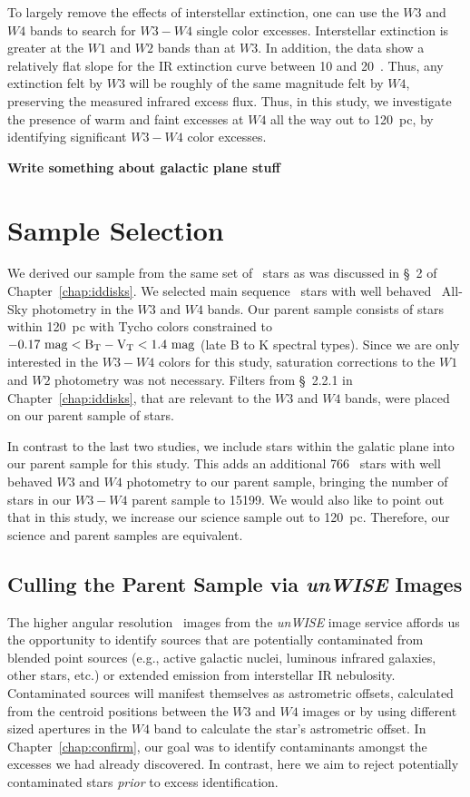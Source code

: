     To largely remove the effects of interstellar extinction, one can use the $W3$ and $W4$ bands to search for $W3-W4$ single color excesses. Interstellar extinction is greater at the $W1$ and $W2$ bands than at $W3$. In addition, the data show a relatively flat slope for the IR extinction curve between 10 and 20\micron\ \citep{Wang2014}. Thus, any extinction felt by $W3$ will be roughly of the same magnitude felt by $W4$, preserving the measured infrared excess flux. Thus, in this study, we investigate the presence of warm and faint excesses at $W4$ all the way out to 120~pc, by identifying significant $W3-W4$ color excesses.
    
    
    \textbf{Write something about galactic plane stuff}


\section{Sample Selection}

    We derived our sample from the same set of \hip\ stars as was discussed in \S~2 of Chapter~\ref{chap:iddisks}. We selected main sequence \hip\ stars with well behaved \WS\ All-Sky photometry in the $W3$ and $W4$ bands. Our parent sample consists of stars within 120~pc with Tycho colors constrained to $-0.17~\rm{mag}< B_T-V_T< 1.4~\rm{mag}$ (late B to K spectral types). Since we are only interested in the $W3-W4$ colors for this study, saturation corrections to the $W1$ and $W2$ photometry was not necessary. Filters from \S~2.2.1 in Chapter~\ref{chap:iddisks}, that are relevant to the $W3$ and $W4$ bands, were placed on our parent sample of stars. 
    
    In contrast to the last two studies, we include stars within the galatic plane into our parent sample for this study. This adds an additional 766 \hip\ stars with well behaved $W3$ and $W4$ photometry to our parent sample, bringing the number of stars in our $W3-W4$ parent sample to 15199. We would also like to point out that in this study, we increase our science sample out to 120~pc. Therefore, our science and parent samples are equivalent.

   \subsection{Culling the Parent Sample via \textit{unWISE} Images}\label{sec:unwise_reject}
    
    The higher angular resolution \WS\ images from the \textit{unWISE} image service \citet{Lang2014} affords us the opportunity to identify sources that are potentially contaminated from blended point sources (e.g., active galactic nuclei, luminous infrared galaxies, other stars, etc.) or extended emission from interstellar IR nebulosity. Contaminated sources will manifest themselves as astrometric offsets, calculated from the centroid positions between the $W3$ and $W4$ images or by using different sized apertures in the $W4$ band to calculate the star's astrometric offset. In Chapter~\ref{chap:confirm}, our goal was to identify contaminants amongst the excesses we had already discovered. In contrast, here we aim to reject potentially contaminated stars \textit{prior} to excess identification.
    
